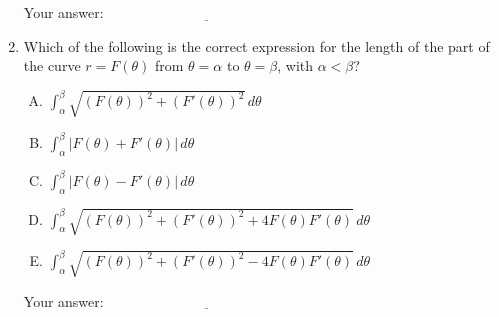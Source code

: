 \documentclass[10pt]{amsart}
\begin{document}
\begin{enumerate}
  \vspace{0.1in}
  Your answer: $\underline{\qquad\qquad\qquad\qquad\qquad\qquad\qquad}$
  \vspace{0.6in}

\item Which of the following is the correct expression for the length
  of the part of the curve $r = F(\theta)$ from $\theta = \alpha$ to
  $\theta = \beta$, with $\alpha < \beta$?

  \begin{enumerate}[(A)]
  \item $\int_\alpha^\beta \sqrt{(F(\theta))^2 + (F'(\theta))^2} \, d\theta$
  \item $\int_\alpha^\beta |F(\theta) + F'(\theta)| \, d\theta$
  \item $\int_\alpha^\beta |F(\theta) - F'(\theta)| \, d\theta$
  \item $\int_\alpha^\beta \sqrt{(F(\theta))^2 + (F'(\theta))^2 + 4F(\theta)F'(\theta)} \, d\theta$
  \item $\int_\alpha^\beta \sqrt{(F(\theta))^2 + (F'(\theta))^2 - 4F(\theta)F'(\theta)} \, d\theta$
  \end{enumerate}

  \vspace{0.1in}
  Your answer: $\underline{\qquad\qquad\qquad\qquad\qquad\qquad\qquad}$
  \vspace{0.6in}

\end{enumerate}
\end{document}
